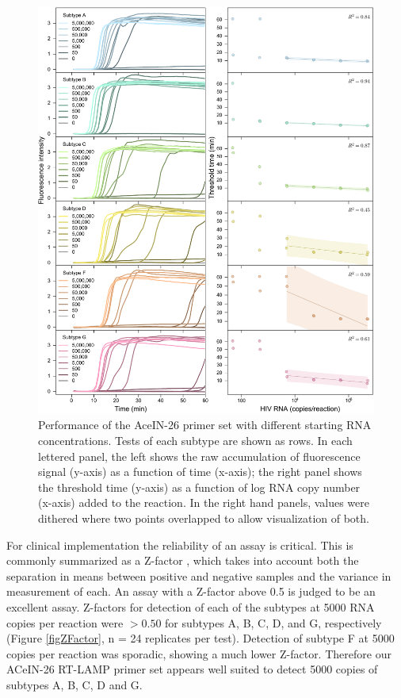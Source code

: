 \documentclass[../sherrill-Mix_thesis.tex]{subfiles}
\begin{document}
			\begin{figure}
			\centering
				\includegraphics[width=\textwidth]{3.pdf} %
			\caption[Performance of the AceIN-26 primer set with different starting RNA concentrations]{Performance of the AceIN-26 primer set with different starting RNA concentrations. Tests of each subtype are shown as rows. In each lettered panel, the left shows the raw accumulation of fluorescence signal (y-axis) as a function of time (x-axis); the right panel shows the threshold time (y-axis) as a function of log RNA copy number (x-axis) added to the reaction. In the right hand panels, values were dithered where two points overlapped to allow visualization of both.}
			\label{figClades}
			\end{figure}

			For clinical implementation the reliability of an assay is critical. This is commonly summarized as a Z-factor \citep{Zhang1999}, which takes into account both the separation in means between positive and negative samples and the variance in measurement of each. An assay with a Z-factor above 0.5 is judged to be an excellent assay. Z-factors for detection of each of the subtypes at 5000 RNA copies per reaction were $>0.50$ for subtypes A, B, C, D, and G, respectively (Figure \ref{figZFactor}, n = 24 replicates per test). Detection of subtype F at 5000 copies per reaction was sporadic, showing a much lower Z-factor. Therefore our ACeIN-26 RT-LAMP primer set appears well suited to detect 5000 copies of subtypes A, B, C, D and G.
\end{document}
